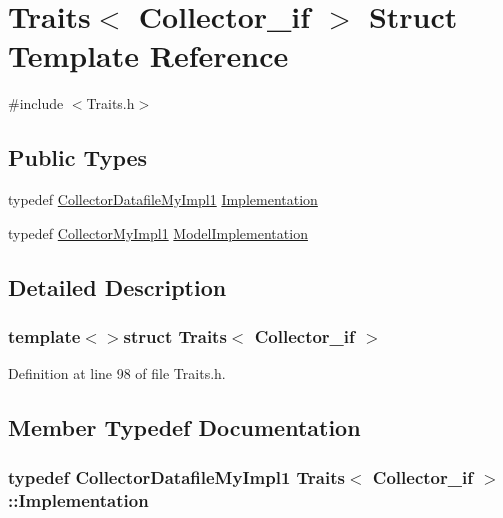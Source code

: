 \hypertarget{struct_traits_3_01_collector__if_01_4}{\section{Traits$<$ Collector\-\_\-if $>$ Struct Template Reference}
\label{struct_traits_3_01_collector__if_01_4}
}


{\ttfamily \#include $<$Traits.\-h$>$}

\subsection*{Public Types}
\begin{DoxyCompactItemize}
\item 
typedef \hyperlink{class_collector_datafile_my_impl1}{Collector\-Datafile\-My\-Impl1} \hyperlink{struct_traits_3_01_collector__if_01_4_a1d9580805be9a661541a69cbf3a947da}{Implementation}
\item 
typedef \hyperlink{class_collector_my_impl1}{Collector\-My\-Impl1} \hyperlink{struct_traits_3_01_collector__if_01_4_a38ef8e0ef3488a361965174720a895ae}{Model\-Implementation}
\end{DoxyCompactItemize}


\subsection{Detailed Description}
\subsubsection*{template$<$$>$struct Traits$<$ Collector\-\_\-if $>$}



Definition at line 98 of file Traits.\-h.



\subsection{Member Typedef Documentation}
\hypertarget{struct_traits_3_01_collector__if_01_4_a1d9580805be9a661541a69cbf3a947da}{
\subsubsection[{Implementation}]{\setlength{\rightskip}{0pt plus 5cm}typedef {\bf Collector\-Datafile\-My\-Impl1} {\bf Traits}$<$ {\bf Collector\-\_\-if} $>$\-::{\bf Implementation}}}\label{struct_traits_3_01_collector__if_01_4_a1d9580805be9a661541a69cbf3a947da}


